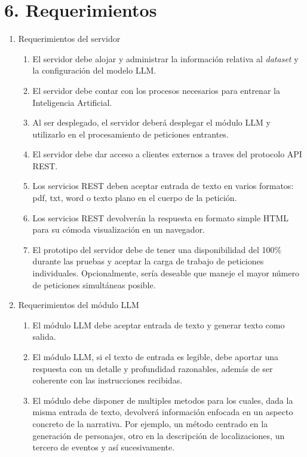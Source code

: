 \documentclass[
11pt, %
]{Clases/charter}
\begin{document}
\section{6. Requerimientos}
\label{sec:requerimientos}
\begin{enumerate}
	\item Requerimientos del servidor
	      \begin{enumerate}
		      \item El servidor debe alojar y administrar la información relativa al \textit{dataset} y la configuración del modelo LLM.
		      \item El servidor debe contar con los procesos necesarios para entrenar la Inteligencia Artificial.
		      \item Al ser desplegado, el servidor deberá desplegar el módulo LLM y utilizarlo en el procesamiento de peticiones entrantes.
		      \item El servidor debe dar acceso a clientes externos a traves del protocolo API REST.
		      \item Los servicios REST deben aceptar entrada de texto en varios formatos: pdf, txt, word o texto plano en el cuerpo de la petición.
		      \item Los servicios REST devolverán la respuesta en formato simple HTML para su cómoda visualización en un navegador.
		      \item El prototipo del servidor debe de tener una disponibilidad del 100\% durante las pruebas y aceptar la carga de trabajo de peticiones individuales.
		            Opcionalmente, sería deseable que maneje el mayor número de peticiones simultáneas posible.
	      \end{enumerate}
	\item Requerimientos del módulo LLM
	      \begin{enumerate}
		      \item El módulo LLM debe aceptar entrada de texto y generar texto como salida.
		      \item El módulo LLM, si el texto de entrada es legible, debe aportar una respuesta con un detalle y profundidad razonables,
		            además de ser coherente con las instrucciones recibidas.
		      \item El módulo debe disponer de multiples metodos para los cuales, dada la misma entrada de texto, devolverá información enfocada en un aspecto concreto de la narrativa.
		            Por ejemplo, un método centrado en la generación de personajes, otro en la descripción de localizaciones, un tercero de eventos y así sucesivamente.

\end{enumerate}
\end{enumerate}
\end{document}
